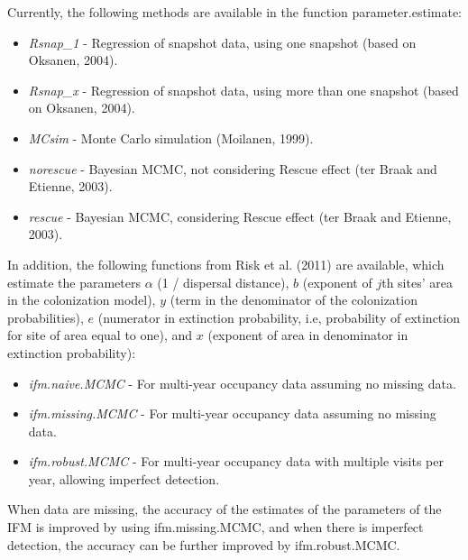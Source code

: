 \documentclass{article}\usepackage[]{graphicx}\usepackage[]{xcolor}
\begin{document}
Currently, the following methods are available in the function parameter.estimate:
\begin{itemize} 
\item \textit{Rsnap\_1} - Regression of snapshot data, using one snapshot (based on Oksanen, 2004).
\item \textit{Rsnap\_x} - Regression of snapshot data, using more than one snapshot (based on Oksanen, 2004).
\item \textit{MCsim} - Monte Carlo simulation (Moilanen, 1999).
\item \textit{norescue} - Bayesian MCMC, not considering Rescue effect (ter Braak and Etienne, 2003).
\item \textit{rescue} - Bayesian MCMC, considering Rescue effect (ter Braak and Etienne, 2003).
\end{itemize}

In addition, the following functions from Risk et al. (2011) are available, which estimate the parameters $\alpha$ (1 / dispersal distance), $b$ (exponent of $j$th sites' area in the colonization model), $y$ (term in the denominator of the colonization probabilities), $e$ (numerator in extinction probability, i.e, probability of extinction for site of area equal to one), and $x$ (exponent of area in denominator in extinction probability):
\begin{itemize}
\item \textit{ifm.naive.MCMC} - For multi-year occupancy data assuming no missing data.
\item \textit{ifm.missing.MCMC} - For multi-year occupancy data assuming no missing data.
\item \textit{ifm.robust.MCMC} - For multi-year occupancy data with multiple visits per year, allowing imperfect detection.
\end{itemize}
When data are missing, the accuracy of the estimates of the parameters of the IFM is improved by using ifm.missing.MCMC, and when there is imperfect detection, the accuracy can be further improved by ifm.robust.MCMC.
\end{document}
